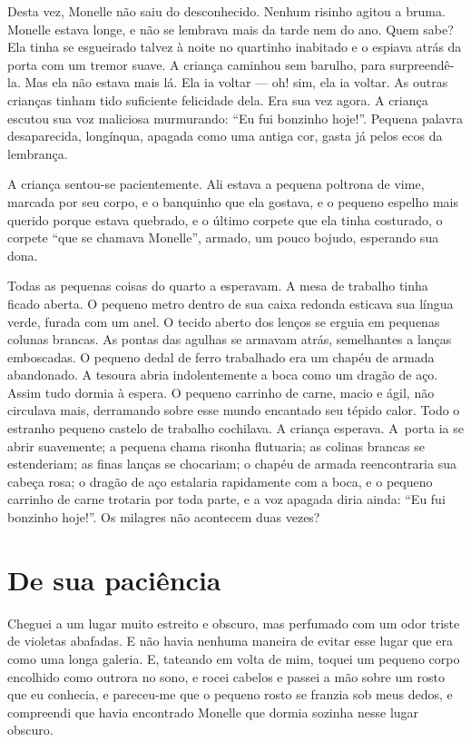 Desta vez, Monelle não saiu do desconhecido. Nenhum risinho agitou a
bruma. Monelle estava longe, e não se lembrava mais da tarde nem do ano.
Quem sabe? Ela tinha se esgueirado talvez à noite no quartinho inabitado e
o espiava atrás da porta com um tremor suave. A criança caminhou sem
barulho, para surpreendê-la. Mas ela não estava mais lá. Ela ia voltar ---
oh! sim, ela ia voltar. As outras crianças tinham tido suficiente
felicidade dela. Era sua vez agora. A criança escutou sua voz maliciosa
murmurando: “Eu fui bonzinho hoje!”. Pequena palavra desaparecida,
longínqua, apagada como uma antiga cor, gasta já pelos ecos da lembrança.

A criança sentou-se pacientemente. Ali estava a pequena poltrona de
vime, marcada por seu corpo, e o banquinho que ela gostava, e o pequeno
espelho mais querido porque estava quebrado, e o último corpete que ela
tinha costurado, o corpete “que se chamava Monelle”, armado, um pouco
bojudo, esperando sua dona.

Todas as pequenas coisas do quarto a esperavam. A mesa de trabalho
tinha ficado aberta. O pequeno metro dentro de sua caixa redonda esticava
sua língua verde, furada com um anel. O tecido aberto dos lenços se erguia
em pequenas colunas brancas. As pontas das agulhas se armavam atrás,
semelhantes a lanças emboscadas. O pequeno dedal de ferro trabalhado era
um chapéu de armada abandonado. A tesoura abria indolentemente a boca como
um dragão de aço. Assim tudo dormia à espera. O pequeno carrinho de carne,
macio e ágil, não circulava mais, derramando sobre esse mundo encantado
seu tépido calor. Todo o estranho pequeno castelo de trabalho cochilava. A
criança esperava. \mbox{A porta} ia se abrir suavemente; a pequena chama risonha
flutuaria; as colinas brancas se estenderiam; as finas lanças se
chocariam; o chapéu de armada reencontraria sua cabeça rosa; o dragão de
aço estalaria rapidamente com a boca, e o pequeno carrinho de carne
trotaria por toda parte, e a voz apagada diria ainda: “Eu fui bonzinho
hoje!”. Os milagres não acontecem duas vezes?

\section*{De sua paciência}

Cheguei a um lugar muito estreito e obscuro, mas perfumado com um odor
triste de violetas abafadas. E não havia nenhuma maneira de evitar esse
lugar que era como uma longa galeria. E, tateando em volta de mim, toquei
um pequeno corpo encolhido como outrora no sono, e rocei cabelos e passei
a mão sobre um rosto que eu conhecia, e pareceu-me que o pequeno rosto se
franzia sob meus dedos, e compreendi que havia encontrado Monelle que
dormia sozinha nesse lugar obscuro.

